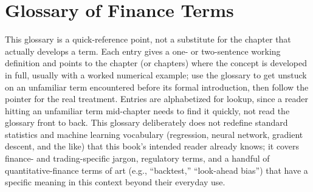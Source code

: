 \documentclass[../ai_in_finance]{subfiles}
\begin{document}
\ifSubfilesClassLoaded{\appendix}{}
\chapter{Glossary of Finance Terms}
\label{app:glossary}


This glossary is a quick-reference point, not a substitute for the chapter that actually develops a term. Each entry gives a one- or two-sentence working definition and points to the chapter (or chapters) where the concept is developed in full, usually with a worked numerical example; use the glossary to get unstuck on an unfamiliar term encountered before its formal introduction, then follow the pointer for the real treatment. Entries are alphabetized for lookup, since a reader hitting an unfamiliar term mid-chapter needs to find it quickly, not read the glossary front to back. This glossary deliberately does not redefine standard statistics and machine learning vocabulary (regression, neural network, gradient descent, and the like) that this book's intended reader already knows; it covers finance- and trading-specific jargon, regulatory terms, and a handful of quantitative-finance terms of art (e.g., ``backtest,'' ``look-ahead bias'') that have a specific meaning in this context beyond their everyday use.
\end{document}
